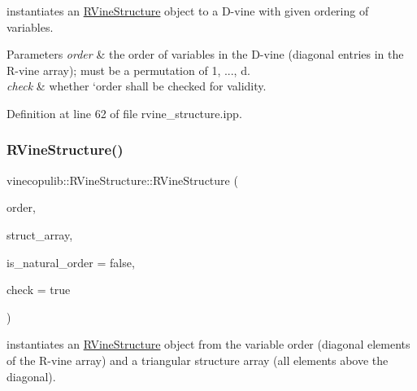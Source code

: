 instantiates an \hyperlink{classvinecopulib_1_1_r_vine_structure}{R\+Vine\+Structure} object to a D-\/vine with given ordering of variables. 


\begin{DoxyParams}{Parameters}
{\em order} & the order of variables in the D-\/vine (diagonal entries in the R-\/vine array); must be a permutation of 1, ..., d. \\
\hline
{\em check} & whether `order shall be checked for validity. \\
\hline
\end{DoxyParams}


Definition at line 62 of file rvine\+\_\+structure.\+ipp.

\mbox{\label{classvinecopulib_1_1_r_vine_structure_a0fb1958f6971b01776133af60ee20ee7}} 
\subsubsection{\texorpdfstring{R\+Vine\+Structure()}{RVineStructure()}\hspace{0.1cm}{\footnotesize\ttfamily [3/3]}}
{\footnotesize\ttfamily vinecopulib\+::\+R\+Vine\+Structure\+::\+R\+Vine\+Structure (\begin{DoxyParamCaption}\item[{const std\+::vector$<$ size\+\_\+t $>$ \&}]{order,  }\item[{const \hyperlink{classvinecopulib_1_1_triangular_array}{Triangular\+Array}$<$ size\+\_\+t $>$ \&}]{struct\+\_\+array,  }\item[{bool}]{is\+\_\+natural\+\_\+order = {\ttfamily false},  }\item[{bool}]{check = {\ttfamily true} }\end{DoxyParamCaption})\hspace{0.3cm}{\ttfamily [inline]}}



instantiates an \hyperlink{classvinecopulib_1_1_r_vine_structure}{R\+Vine\+Structure} object from the variable order (diagonal elements of the R-\/vine array) and a triangular structure array (all elements above the diagonal). 



